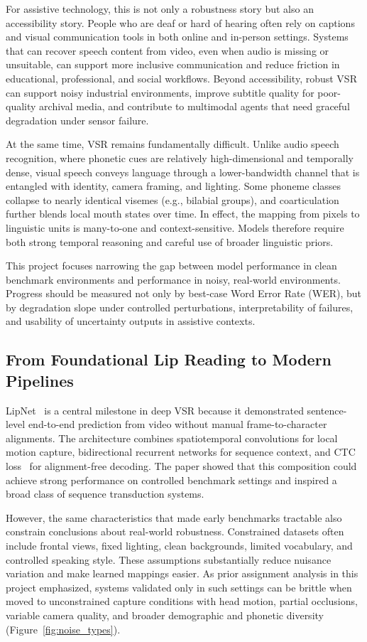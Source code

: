 \documentclass[10pt,twocolumn,letterpaper]{article}
\begin{document}
For assistive technology, this is not only a robustness story but also an accessibility story. People who are deaf or hard of hearing often rely on captions and visual communication tools in both online and in-person settings. Systems that can recover speech content from video, even when audio is missing or unsuitable, can support more inclusive communication and reduce friction in educational, professional, and social workflows. Beyond accessibility, robust VSR can support noisy industrial environments, improve subtitle quality for poor-quality archival media, and contribute to multimodal agents that need graceful degradation under sensor failure.

At the same time, VSR remains fundamentally difficult. Unlike audio speech recognition, where phonetic cues are relatively high-dimensional and temporally dense, visual speech conveys language through a lower-bandwidth channel that is entangled with identity, camera framing, and lighting. Some phoneme classes collapse to nearly identical visemes (e.g., bilabial groups), and coarticulation further blends local mouth states over time. In effect, the mapping from pixels to linguistic units is many-to-one and context-sensitive. Models therefore require both strong temporal reasoning and careful use of broader linguistic priors.

This project focuses narrowing the gap between model performance in clean benchmark environments and performance in noisy, real-world environments. Progress should be measured not only by best-case Word Error Rate (WER), but by degradation slope under controlled perturbations, interpretability of failures, and usability of uncertainty outputs in assistive contexts.

\subsection{From Foundational Lip Reading to Modern Pipelines}
LipNet~\cite{assael2016lipnet} is a central milestone in deep VSR because it demonstrated sentence-level end-to-end prediction from video without manual frame-to-character alignments. The architecture combines spatiotemporal convolutions for local motion capture, bidirectional recurrent networks for sequence context, and CTC loss~\cite{graves2006ctc} for alignment-free decoding. The paper showed that this composition could achieve strong performance on controlled benchmark settings and inspired a broad class of sequence transduction systems.

However, the same characteristics that made early benchmarks tractable also constrain conclusions about real-world robustness. Constrained datasets often include frontal views, fixed lighting, clean backgrounds, limited vocabulary, and controlled speaking style. These assumptions substantially reduce nuisance variation and make learned mappings easier. As prior assignment analysis in this project emphasized, systems validated only in such settings can be brittle when moved to unconstrained capture conditions with head motion, partial occlusions, variable camera quality, and broader demographic and phonetic diversity (Figure~\ref{fig:noise_types}).
\end{document}
